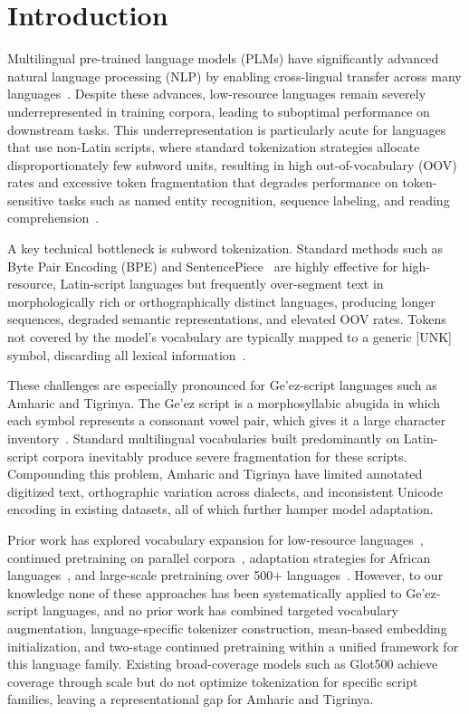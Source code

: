 \section{Introduction}

Multilingual pre-trained language models (PLMs) have significantly advanced natural language processing (NLP) by enabling cross-lingual transfer across many languages~\cite{wang2023pretrained,xue2021mt5}. Despite these advances, low-resource languages remain severely underrepresented in training corpora, leading to suboptimal performance on downstream tasks. This underrepresentation is particularly acute for languages that use non-Latin scripts, where standard tokenization strategies allocate disproportionately few subword units, resulting in high out-of-vocabulary (OOV) rates and excessive token fragmentation that degrades performance on token-sensitive tasks such as named entity recognition, sequence labeling, and reading comprehension~\cite{chau2021specializing,ahia2023all}.

A key technical bottleneck is subword tokenization. Standard methods such as Byte Pair Encoding (BPE) and SentencePiece~\cite{kudo2018sentencepiece} are highly effective for high-resource, Latin-script languages but frequently over-segment text in morphologically rich or orthographically distinct languages, producing longer sequences, degraded semantic representations, and elevated OOV rates. Tokens not covered by the model's vocabulary are typically mapped to a generic [UNK] symbol, discarding all lexical information~\cite{liu2024ofa,xue2022byt5}.

These challenges are especially pronounced for Ge'ez-script languages such as Amharic and Tigrinya. The Ge'ez script is a morphosyllabic abugida in which each symbol represents a consonant vowel pair, which gives it a large character inventory~\cite{getatchew1996ethiopic}. Standard multilingual vocabularies built predominantly on Latin-script corpora inevitably produce severe fragmentation for these scripts. Compounding this problem, Amharic and Tigrinya have limited annotated digitized text, orthographic variation across dialects, and inconsistent Unicode encoding in existing datasets, all of which further hamper model adaptation.

Prior work has explored vocabulary expansion for low-resource languages~\cite{wang2019improving}, continued pretraining on parallel corpora~\cite{ebrahimi2021adapt}, adaptation strategies for African languages~\cite{alabi2022adapting}, and large-scale pretraining over 500+ languages~\cite{imanigooghari2023glot500}. However, to our knowledge none of these approaches has been systematically applied to Ge'ez-script languages, and no prior work has combined targeted vocabulary augmentation, language-specific tokenizer construction, mean-based embedding initialization, and two-stage continued pretraining within a unified framework for this language family. Existing broad-coverage models such as Glot500 achieve coverage through scale but do not optimize tokenization for specific script families, leaving a representational gap for Amharic and Tigrinya.

